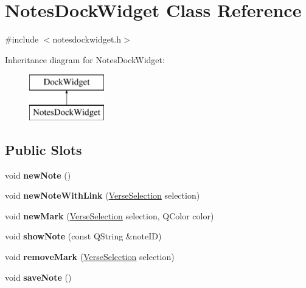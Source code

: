 \hypertarget{classNotesDockWidget}{
\section{NotesDockWidget Class Reference}
\label{classNotesDockWidget}
}


{\ttfamily \#include $<$notesdockwidget.h$>$}

Inheritance diagram for NotesDockWidget:\begin{figure}[H]
\begin{center}
\leavevmode
\includegraphics[height=2cm]{classNotesDockWidget}
\end{center}
\end{figure}
\subsection*{Public Slots}
\begin{DoxyCompactItemize}
\item 
\hypertarget{classNotesDockWidget_a61831394a55b15b33285e12f7635a18b}{
void {\bfseries newNote} ()}
\label{classNotesDockWidget_a61831394a55b15b33285e12f7635a18b}

\item 
\hypertarget{classNotesDockWidget_a5338309f3c8f88da4ebec0a691870c02}{
void {\bfseries newNoteWithLink} (\hyperlink{classVerseSelection}{VerseSelection} selection)}
\label{classNotesDockWidget_a5338309f3c8f88da4ebec0a691870c02}

\item 
\hypertarget{classNotesDockWidget_a81644f3bd88ab738a3d1919a2e98382e}{
void {\bfseries newMark} (\hyperlink{classVerseSelection}{VerseSelection} selection, QColor color)}
\label{classNotesDockWidget_a81644f3bd88ab738a3d1919a2e98382e}

\item 
\hypertarget{classNotesDockWidget_a84b7afb87e8f1d3aa46e3fce0f88f1a8}{
void {\bfseries showNote} (const QString \&noteID)}
\label{classNotesDockWidget_a84b7afb87e8f1d3aa46e3fce0f88f1a8}

\item 
\hypertarget{classNotesDockWidget_aeffc894ea15f5944d8943d26d5a9c8d0}{
void {\bfseries removeMark} (\hyperlink{classVerseSelection}{VerseSelection} selection)}
\label{classNotesDockWidget_aeffc894ea15f5944d8943d26d5a9c8d0}

\item 
\hypertarget{classNotesDockWidget_a475c7819f5d1e57cc49a56b1ebd63f33}{
void {\bfseries saveNote} ()}
\label{classNotesDockWidget_a475c7819f5d1e57cc49a56b1ebd63f33}

\end{DoxyCompactItemize}
